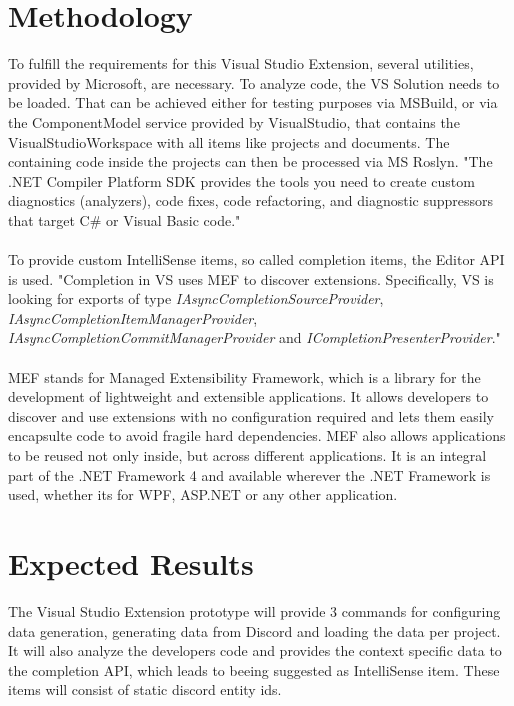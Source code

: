 \section{Methodology}
To fulfill the requirements for this Visual Studio Extension, several utilities, provided by Microsoft, are necessary.
To analyze code, the VS Solution needs to be loaded. That can be achieved either for testing purposes via MSBuild, or via the ComponentModel service provided by VisualStudio, that contains the VisualStudioWorkspace with all items like projects and documents. The containing code inside the projects can then be processed via MS Roslyn.
"The .NET Compiler Platform SDK provides the tools you need to create custom diagnostics (analyzers), code fixes, code refactoring, and diagnostic suppressors that target C\# or Visual Basic code." \cite{tutorialfirstanalyser}\\\\
To provide custom IntelliSense items, so called completion items, the Editor API is used. 
"Completion in VS uses MEF to discover extensions. Specifically, VS is looking for exports of type \textit{IAsyncCompletionSourceProvider},  \textit{IAsyncCompletionItemManagerProvider}, \textit{IAsyncCompletionCommitManagerProvider} and \textit{ICompletionPresenterProvider}." \cite{asynccompletionapi}\\\\
MEF stands for Managed Extensibility Framework, which is a library for the development of lightweight and extensible applications. It allows developers to discover and use extensions with no configuration required and lets them easily encapsulte code to avoid fragile hard dependencies. MEF also allows applications to be reused not only inside, but across different applications. It is an integral part of the .NET Framework 4 and available wherever the .NET Framework is used, whether its for WPF, ASP.NET or any other application.\cite{mef} 


\section{Expected Results}
The Visual Studio Extension prototype will provide 3 commands for configuring data generation, generating data from Discord and loading the data per project. It will also analyze the developers code and provides the context specific data to the completion API, which leads to beeing suggested as IntelliSense item. These items will consist of static discord entity ids.
